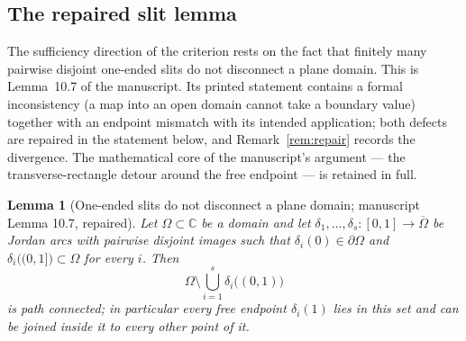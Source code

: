 \documentclass[11pt,reqno]{amsart}
\newtheorem{lemma}[theorem]{Lemma}
\theoremstyle{definition}
\theoremstyle{remark}
\newcommand{\C}{\mathbb C}
\begin{document}
\subsection{The repaired slit lemma}\label{subsec:D-slits}

The sufficiency direction of the criterion rests on the fact that finitely many pairwise
disjoint one-ended slits do not disconnect a plane domain. This is Lemma~10.7 of the
manuscript. Its printed statement contains a formal inconsistency (a map into an open
domain cannot take a boundary value) together with an endpoint mismatch with its
intended application; both defects are repaired in the statement below, and
Remark~\ref{rem:repair} records the divergence. The mathematical core of the
manuscript's argument --- the transverse-rectangle detour around the free endpoint ---
is retained in full.

\begin{lemma}[One-ended slits do not disconnect a plane domain; manuscript Lemma 10.7,
repaired]\label{lem:slits}
Let $\Omega\subset\C$ be a domain and let
$\delta_1,\dots,\delta_s\colon[0,1]\to\overline{\Omega}$ be Jordan arcs with pairwise
disjoint images such that $\delta_i(0)\in\partial\Omega$ and
$\delta_i\bigl((0,1]\bigr)\subset\Omega$ for every $i$. Then
\[
\Omega\setminus\bigcup_{i=1}^{s}\delta_i\bigl((0,1)\bigr)
\]
is path connected; in particular every free endpoint $\delta_i(1)$ lies in this set and
can be joined inside it to every other point of it.
\end{lemma}
\end{document}
